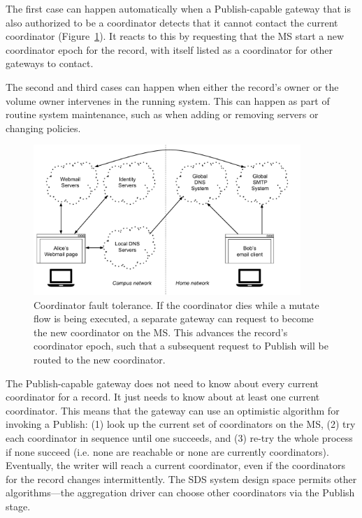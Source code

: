 The first case can happen automatically when a Publish-capable gateway that is
also authorized to be a coordinator detects that it cannot contact the
current coordinator (Figure~\ref{fig:chap2-coordinator-change}).  It reacts to this by requesting that the MS start
a new coordinator epoch for the record, with itself listed as a coordinator for other gateways to contact.

The second and third cases can happen when either the record's owner or the
volume owner intervenes in the running system.  This can happen as part of routine system
maintenance, such as when adding or removing servers or changing
policies.

\begin{figure}[h!]
   \centering
   \includegraphics[width=0.9\textwidth,page=11]{figures/dissertation-figures}
   \caption{Coordinator fault tolerance.  If the coordinator dies while a mutate
   flow is being executed, a separate gateway can request to become the new
   coordinator on the MS.  This advances the record's coordinator epoch, such
   that a subsequent request to Publish will be routed to the new coordinator.}
   \label{fig:chap2-coordinator-change}
\end{figure}

The Publish-capable gateway does not need to know
about every current coordinator for a record.  It just needs to know about
at least one current coordinator.  This means that the gateway can use an
optimistic algorithm for invoking a Publish: 
(1) look up the current set of coordinators on the MS, (2) try each coordinator in
sequence until one succeeds, and (3) re-try the whole process if none
succeed (i.e. none are reachable or none are currently coordinators).
Eventually, the writer will reach a current coordinator, even if the
coordinators for the record changes intermittently.  The SDS system design space
permits other algorithms---the aggregation driver can choose other coordinators
via the Publish stage.

